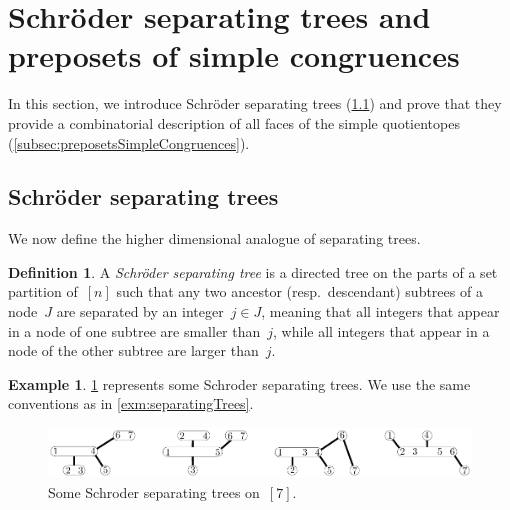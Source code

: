 \documentclass{amsart}
\theoremstyle{definition}
\newtheorem{definition}[theorem]{Definition}
\newtheorem{example}[theorem]{Example}
\newcommand{\darkblue}{\color{darkblue}} %
\newcommand{\defn}[1]{\textsl{\darkblue #1}} %
\newcommand{\vincent}[1]{\todo[color=blue!30]{#1 \\ \hfill --- V.}}
\begin{document}

%


\section{Schröder separating trees and preposets of simple congruences}
\label{sec:SchroderSeparatingTreesPreposetsSimpleCongruences}

In this section, we introduce Schröder separating trees (\cref{subsec:SchroderSeparatingTrees}) and prove that they provide a combinatorial description of all faces of the simple quotientopes (\cref{subsec:preposetsSimpleCongruences}).


\subsection{Schröder separating trees}
\label{subsec:SchroderSeparatingTrees}

We now define the higher dimensional analogue of separating trees.

\begin{definition}
\label{def:ShcroderSeparatingTree}
A \defn{Schröder separating tree} is a directed tree on the parts of a set partition of~$[n]$ such that any two ancestor (resp.~descendant) subtrees of a node~$J$ are separated by an integer~$j \in J$, meaning that all integers that appear in a node of one subtree are smaller than~$j$, while all integers that appear in a node of the other subtree are larger than~$j$.
\end{definition}

\begin{example}
\label{exm:SchroderSeparatingTrees}
\cref{fig:SchroderSeparatingTrees} represents some Schroder separating trees. We use the same conventions as in \cref{exm:separatingTrees}.
%
\begin{figure}[h]
	\capstart
	\centerline{\includegraphics[scale=.85]{SchroderSeparatingTrees}}
	\caption{Some Schroder separating trees on~$[7]$.}
	\label{fig:SchroderSeparatingTrees}
\end{figure}
%
\end{example}
\end{document}
